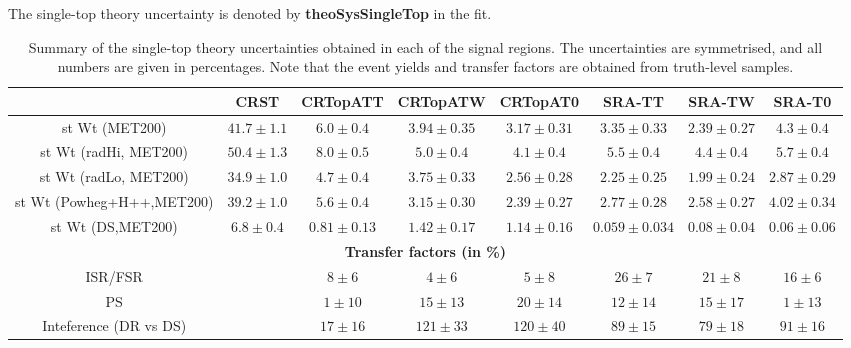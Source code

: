\begin{description}
  The single-top theory uncertainty is denoted by {\bf theoSysSingleTop} in the fit.

  \begin{table}[!h]
    \begin{center} \footnotesize
   \begin{tabular}{|c|c|c|c|c|c|c|c|} 
        \hline
        & CRST & CRTopATT & CRTopATW & CRTopAT0 & SRA-TT & SRA-TW & SRA-T0 \\ \hline
        \hline \hline 
        st Wt (MET200)&          $41.7\pm 1.1$&          $6.0\pm 0.4$&   $3.94\pm 0.35$&         $3.17\pm 0.31$&         $3.35\pm 0.33$&         $2.39\pm 0.27$&         $4.3\pm 0.4$\\
st Wt (radHi, MET200)&   $50.4\pm 1.3$&          $8.0\pm 0.5$&   $5.0\pm 0.4$&   $4.1\pm 0.4$&   $5.5\pm 0.4$&   $4.4\pm 0.4$&   $5.7\pm 0.4$\\
st Wt (radLo, MET200)&   $34.9\pm 1.0$&          $4.7\pm 0.4$&   $3.75\pm 0.33$&         $2.56\pm 0.28$&         $2.25\pm 0.25$&         $1.99\pm 0.24$&         $2.87\pm 0.29$\\
st Wt (Powheg+H++,MET200)&       $39.2\pm 1.0$&          $5.6\pm 0.4$&   $3.15\pm 0.30$&         $2.39\pm 0.27$&         $2.77\pm 0.28$&         $2.58\pm 0.27$&         $4.02\pm 0.34$\\
st Wt (DS,MET200)&       $6.8\pm 0.4$&   $0.81\pm 0.13$&         $1.42\pm 0.17$&         $1.14\pm 0.16$&         $0.059\pm 0.034$&       $0.08\pm 0.04$&         $0.06\pm 0.06$\\
       \hline
       \multicolumn{8}{c}{\bf Transfer factors (in \%)} \\ \hline
       \hline
       ISR/FSR &  &       $8\pm6$&        $4\pm6$&        $5\pm8$&        $26\pm7$&       $21\pm8$&       $16\pm6$\\
       PS &    &    $1\pm10$&       $15\pm13$&      $20\pm14$&      $12\pm14$&      $15\pm17$&      $1\pm13$\\
       Inteference (DR vs DS) & &        $17\pm16$&      $121\pm33$&     $120\pm40$&     $89\pm15$&      $79\pm18$&      $91\pm16$\\
       \hline
   \end{tabular}
    \end{center}
    \caption{Summary of the single-top theory uncertainties obtained in each of the signal regions. The uncertainties are symmetrised, and all numbers are given in percentages. Note that the event yields and transfer factors are obtained from truth-level samples. %
}
    \label{tab:single_top_unc1}
 \end{table}


\end{description}
